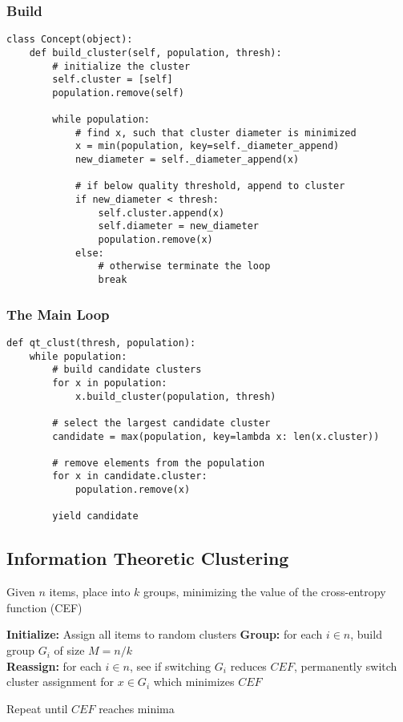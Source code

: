 \documentclass{beamer}
\begin{document}
\begin{frame}[fragile]
\frametitle{Build}
\begin{verbatim}
class Concept(object):
    def build_cluster(self, population, thresh):
        # initialize the cluster
        self.cluster = [self]
        population.remove(self)

        while population:
            # find x, such that cluster diameter is minimized
            x = min(population, key=self._diameter_append)
            new_diameter = self._diameter_append(x)

            # if below quality threshold, append to cluster
            if new_diameter < thresh:
                self.cluster.append(x)
                self.diameter = new_diameter
                population.remove(x)
            else:
                # otherwise terminate the loop
                break
\end{verbatim}
\end{frame}

\begin{frame}[fragile]
\frametitle{The Main Loop}
\begin{verbatim}
def qt_clust(thresh, population):
    while population:
        # build candidate clusters
        for x in population:
            x.build_cluster(population, thresh)
    
        # select the largest candidate cluster
        candidate = max(population, key=lambda x: len(x.cluster))
  
        # remove elements from the population
        for x in candidate.cluster:
            population.remove(x)
    
        yield candidate
\end{verbatim}
\end{frame}

\subsection{Information Theoretic Clustering}
\begin{frame}
Given $n$ items, place into $k$ groups, minimizing the value of the cross-entropy function (CEF) \\

\bigskip

\textbf{Initialize:} Assign all items to random clusters
\textbf{Group:} for each $i \in n$, build group $G_i$ of size $M = n / k$ \\
\textbf{Reassign:} for each $i \in n$, see if switching $G_i$ reduces $CEF$, permanently switch cluster assignment for $x \in G_i$ which minimizes $CEF$ \\

\bigskip

Repeat until $CEF$ reaches minima
\end{frame}
\end{document}
